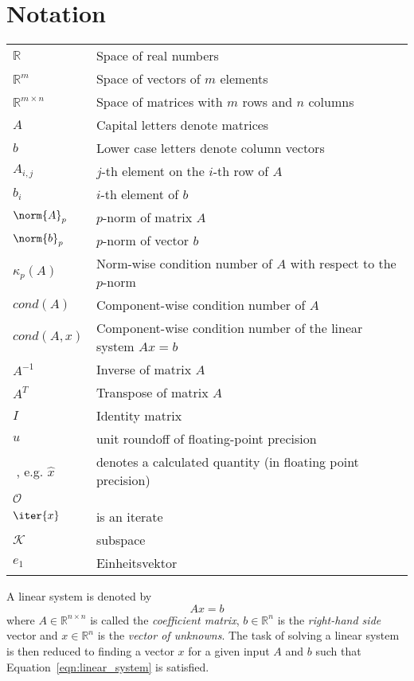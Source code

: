 \section{Notation}
\label{sec:notation}


\begin{tabular}{ll}
  $\mathbb{R}$ & Space of real numbers \\
  $\mathbb{R}^{m}$ & Space of vectors of $m$ elements \\
  $\mathbb{R}^{m \times n}$ & Space of matrices with $m$ rows and $n$ columns \\
  $A$ & Capital letters denote matrices \\
  $b$ & Lower case letters denote column vectors \\
  $A_{i,j}$ & $j$-th element on the $i$-th row of $A$ \\
  $b_{i}$ & $i$-th element of $b$ \\
  $\norm{A}_p$ & $p$-norm of matrix $A$ \\
  $\norm{b}_p$ & $p$-norm of vector $b$ \\
  $\kappa_{p}(A)$ & Norm-wise condition number of $A$ with respect to the $p$-norm \\
  $cond(A)$ & Component-wise condition number of $A$ \\
  $cond(A, x)$ & Component-wise condition number of the linear system $Ax=b$ \\
  $A^{-1}$ & Inverse of matrix $A$ \\
  $A^T$    & Transpose of matrix $A$ \\
  $I$      & Identity matrix  \\
  $u$      & unit roundoff of floating-point precision \\
  $\hat{}\;$, e.g. $\hat{x}$ & denotes a calculated quantity (in floating point precision) \\
  $\mathcal{O}$ & \\
  $\iter{x}$ & is an iterate \\
  $\mathcal{K}$ & subspace \\
  $e_1$      & Einheitsvektor \\
\end{tabular}
\vspace{0.5cm}

\noindent A linear system is denoted by
\begin{equation}
\label{eqn:linear_system}
    Ax=b
\end{equation}
\noindent where $A \in \mathbb{R}^{n \times n}$ is called the \textit{coefficient matrix}, $b \in \mathbb{R}^{n}$ is the \textit{right-hand side} vector and $x \in \mathbb{R}^{n}$ is the \textit{vector of unknowns}. The task of solving a linear system is then reduced to finding a vector $x$ for a given input $A$ and $b$ such that Equation~\hyperref[eqn:linear_system]{\ref{eqn:linear_system}} is satisfied.

